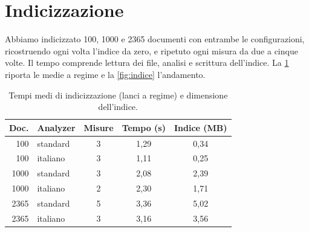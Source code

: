 \documentclass[10pt,a4paper,twocolumn]{article}
\begin{document}
\section{Indicizzazione}
Abbiamo indicizzato 100, 1000 e 2365 documenti con entrambe le configurazioni, ricostruendo ogni volta
l'indice da zero, e ripetuto ogni misura da due a cinque volte. Il tempo comprende lettura dei file, analisi e
scrittura dell'indice. La \cref{tab:tempi} riporta le medie a regime e la \cref{fig:indice} l'andamento.

\begin{table}[t]
\centering\footnotesize
\caption{Tempi medi di indicizzazione (lanci a regime) e dimensione dell'indice.}
\label{tab:tempi}
\begin{tabular}{@{}rlccc@{}}
\toprule
\textbf{Doc.} & \textbf{Analyzer} & \textbf{Misure} & \textbf{Tempo (s)} & \textbf{Indice (MB)} \\
\midrule
 100 & standard & 3 & 1,29 & 0,34 \\
 100 & italiano & 3 & 1,11 & 0,25 \\
1000 & standard & 3 & 2,08 & 2,39 \\
1000 & italiano & 2 & 2,30 & 1,71 \\
2365 & standard & 5 & 3,36 & 5,02 \\
2365 & italiano & 3 & 3,16 & 3,56 \\
\bottomrule
\end{tabular}
\end{table}
\end{document}
